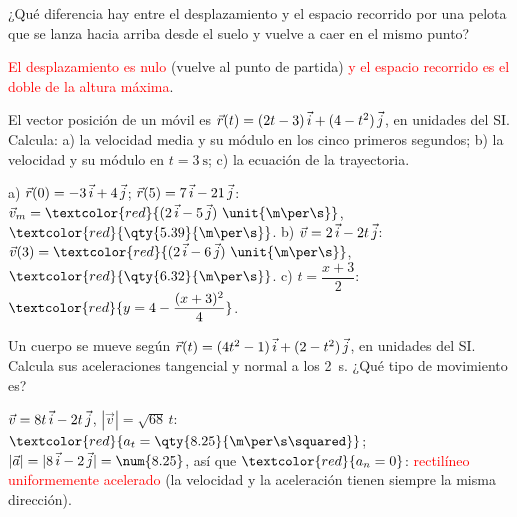 \begin{exercise}
    ¿Qué diferencia hay entre el desplazamiento y el espacio recorrido por una pelota que se lanza hacia arriba desde el suelo y
    vuelve a caer en el mismo punto?
    \begin{solu}
        \textcolor{red}{El desplazamiento es nulo} (vuelve al punto de partida) \textcolor{red}{y el espacio recorrido es el doble de la
        altura máxima}.
    \end{solu}
\end{exercise}

\begin{exercise}
    El vector posición de un móvil es \(\vec r(t) = (2t - 3)\,\vec{i} + (4 - t^2)\,\vec{j}\), en unidades del SI. Calcula: a) la velocidad
    media y su módulo en los cinco primeros segundos; b) la velocidad y su módulo en \(t = \qty{3}{\s}\); c) la ecuación de la
    trayectoria.
    \begin{solu}
        a) \(\vec r(0) = -3\,\vec{i} + 4\,\vec{j}\); \(\vec r(5) = 7\,\vec{i} - 21\,\vec{j}\): \(\vec v_m = \textcolor{red}{(2\,\ivec - 5\,\jvec)~\unit{\m\per\s}}\),
        \(\textcolor{red}{\qty{5.39}{\m\per\s}}\). b) \(\vec v = 2\,\vec{i} - 2t\,\vec{j}\): \(\vec v(3) = \textcolor{red}{(2\,\ivec - 6\,\jvec)~\unit{\m\per\s}}\),
        \(\textcolor{red}{\qty{6.32}{\m\per\s}}\). c) \(t = \dfrac{x + 3}{2}\): \(\textcolor{red}{y = 4 - \dfrac{(x + 3)^2}{4}}\).
    \end{solu}
\end{exercise}

\begin{exercise}
    Un cuerpo se mueve según \(\vec r(t) = (4t^2 - 1)\,\vec{i} + (2 - t^2)\,\vec{j}\), en unidades del SI. Calcula sus aceleraciones
    tangencial y normal a los \qty{2}{\s}. ¿Qué tipo de movimiento es?
    \begin{solu}
        \(\vec v = 8t\,\vec{i} - 2t\,\vec{j}\), \(|\vec v| = \sqrt{68}\,t\): \(\textcolor{red}{a_t = \qty{8.25}{\m\per\s\squared}}\);
        \(|\vec a| = |8\,\ivec - 2\,\jvec| = \num{8.25}\), así que \(\textcolor{red}{a_n = 0}\): \textcolor{red}{rectilíneo uniformemente
        acelerado} (la velocidad y la aceleración tienen siempre la misma dirección).
    \end{solu}
\end{exercise}

